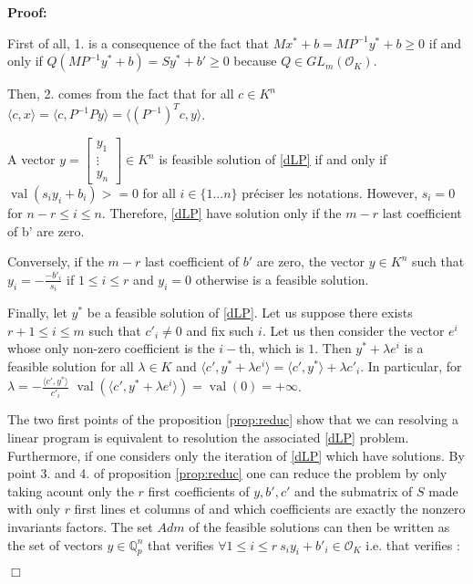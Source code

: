 \documentclass[a4paper,12pt]{article}
\newenvironment{proof}{\hbox{}\vspace{-0.5cm} {\bf Proof:}}{\hfill $\Box$ \\}
\newcommand{\corentin}[1]{{\color{red} #1}} %
\DeclareMathOperator{\val}{val}
\newcommand{\OK}{\mathcal{O}_K}
\begin{document}
\begin{proof}

  First of all, 1. is a consequence of the fact that $Mx^*+b = MP^{-1}y^* +b\geq 0$ if and only if $Q(MP^{-1}y^* + b) = Sy^* + b' \geq 0$ because $Q \in GL_m(\OK)$.

  Then, 2. comes from the fact that for all $c \in K^n$ $\langle c, x\rangle = \langle c, P^{-1}Py \rangle = \langle \left(P^{-1}\right)^T c, y \rangle$.

  A vector $y =  \left[\begin{smallmatrix} y_1 \\ \vdots \\ y_n \end{smallmatrix}\right] \in K^n$ is feasible solution of \ref{dLP} if and only if $\val(s_i y_i + b_i) >=0$ for all $i \in \{1...n\}$ \corentin{préciser les notations}. 
  However, $s_i =0$ for $n-r \leq i\leq n$. Therefore, \ref{dLP} have solution only if the $m-r$ last coefficient of b' are zero.
  
  Conversely, if the $m-r$ last coefficient of $b'$ are zero, the vector $y \in K^n$ such that $y_i = -\frac{-b'_i}{s_i}$ if $1 \leq i \leq r$ and $y_i =0$ otherwise is a feasible solution.

  Finally, let $y^*$ be a feasible solution of \ref{dLP}. Let us suppose there exists $r+1 \leq i \leq m$ such that $c'_i \neq  0$ and fix such $i$. Let us then consider the vector $e^i$ whose only non-zero coefficient is the $i-$th, which is $1$. Then $y^*+\lambda e^i$ is a feasible solution for all $\lambda \in K$ and $\langle c', y^* + \lambda e^i\rangle = \langle c' , y^* \rangle + \lambda c'_i$. In particular, for $\lambda = -\frac{\langle c', y^* \rangle}{c'_i}$ $\val \left( \langle c', y^* + \lambda e ^i \rangle\right) = \val (0) = + \infty$. 

The two first points of the proposition \ref{prop:reduc} show that we can resolving a linear program is equivalent to resolution the associated \ref{dLP} problem. Furthermore, if one considers only the iteration of \ref{dLP} which have solutions. By point 3. and 4. of proposition \ref{prop:reduc} one can reduce the problem by only taking acount only the $r$ first coefficients of $y, b', c'$ and the submatrix of $S$ made with only $r$ first lines et columns of and which coefficients are exactly the nonzero invariants factors. The set $Adm$ of the feasible solutions can then be written as the set of vectors $y \in \mathbb{Q}_{ p } ^n$ that verifies $\forall 1 \le i\le r \ s_i y_i + b'_i \in \OK$ i.e. that verifies :


\end{proof}
\end{document}
